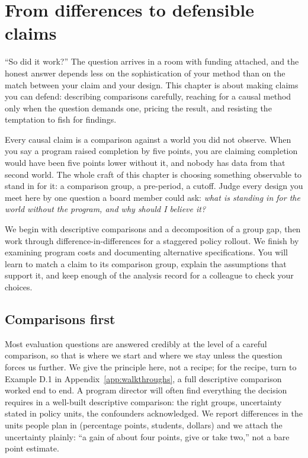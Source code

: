 \chapter{From differences to defensible claims}\label{ch:claims}

\enquote{So did it work?} The question arrives in a room with funding attached, and the honest answer depends less on the sophistication of your method than on the match between your claim and your design. This chapter is about making claims you can defend: describing comparisons carefully, reaching for a causal method only when the question demands one, pricing the result, and resisting the temptation to fish for findings.

Every causal claim is a comparison against a world you did not observe. When you say a program raised completion by five points, you are claiming completion would have been five points lower without it, and nobody has data from that second world. The whole craft of this chapter is choosing something observable to stand in for it: a comparison group, a pre-period, a cutoff. Judge every design you meet here by one question a board member could ask: \emph{what is standing in for the world without the program, and why should I believe it?}

We begin with descriptive comparisons and a decomposition of a group gap, then work through difference-in-differences for a staggered policy rollout. We finish by examining program costs and documenting alternative specifications. You will learn to match a claim to its comparison group, explain the assumptions that support it, and keep enough of the analysis record for a colleague to check your choices.

\section{Comparisons first}\label{sec:comparisons}
Most evaluation questions are answered credibly at the level of a careful comparison, so that is where we start and where we stay unless the question forces us further. We give the principle here, not a recipe; for the recipe, turn to Example D.1 in Appendix~\ref{app:walkthroughs}, a full descriptive comparison worked end to end. A program director will often find everything the decision requires in a well-built descriptive comparison: the right groups, uncertainty stated in policy units, the confounders acknowledged. We report differences in the units people plan in (percentage points, students, dollars) and we attach the uncertainty plainly: \enquote{a gain of about four points, give or take two,} not a bare point estimate.

